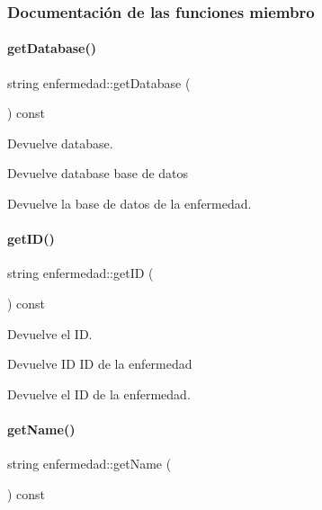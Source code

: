 \subsubsection{Documentación de las funciones miembro}
\hypertarget{classenfermedad_afdc354a1fe894cc0ce209bcdccf86421}{}\label{classenfermedad_afdc354a1fe894cc0ce209bcdccf86421} 
\paragraph{\texorpdfstring{get\+Database()}{getDatabase()}}
{\footnotesize\ttfamily string enfermedad\+::get\+Database (\begin{DoxyParamCaption}{ }\end{DoxyParamCaption}) const}



Devuelve database. 

\begin{DoxyReturn}{Devuelve}
database base de datos
\end{DoxyReturn}
Devuelve la base de datos de la enfermedad. \hypertarget{classenfermedad_aed3bb5ee6da05d6ccd56e648da3ae429}{}\label{classenfermedad_aed3bb5ee6da05d6ccd56e648da3ae429} 
\paragraph{\texorpdfstring{get\+I\+D()}{getID()}}
{\footnotesize\ttfamily string enfermedad\+::get\+ID (\begin{DoxyParamCaption}{ }\end{DoxyParamCaption}) const}



Devuelve el ID. 

\begin{DoxyReturn}{Devuelve}
ID ID de la enfermedad
\end{DoxyReturn}
Devuelve el ID de la enfermedad. \hypertarget{classenfermedad_ac45bc03880429b312ba05c6277d5043f}{}\label{classenfermedad_ac45bc03880429b312ba05c6277d5043f} 
\paragraph{\texorpdfstring{get\+Name()}{getName()}}
{\footnotesize\ttfamily string enfermedad\+::get\+Name (\begin{DoxyParamCaption}{ }\end{DoxyParamCaption}) const}



